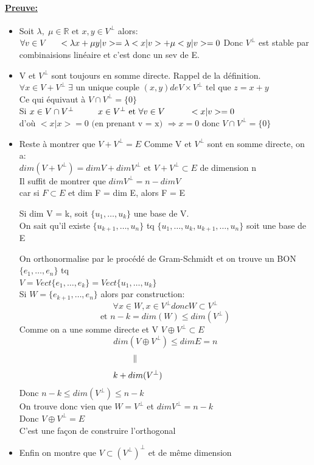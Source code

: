\documentclass{article}
\newcommand\tab[1][1cm]{\hspace*{#1}}
\begin{document}
\paragraph{\underline{Preuve:}}
\begin{itemize}
    \item Soit $\lambda,\; \mu \in \mathbb{R} \mbox{ et } x, y \in V^\perp$ alors:\\
$\forall v \in V \tab[0.5cm] <\lambda x + \mu y | v> = \lambda <x | v> + \mu <y | v> = 0$
Donc $V^\perp$ est stable par combinaisions linéaire et c'est donc un sev de E.
    \item V et $V^\perp$ sont toujours en somme directe.
Rappel de la définition. \\
$\forall x \in V + V^\perp \; \exists \mbox{ un unique couple } (x, y) de V \times V^\perp \mbox{ tel que } z = x + y$\\
Ce qui équivaut à $V \cap V^\perp = \{0\}$\\
Si $x \in V \cap V^\perp \tab x \in V^\perp \mbox{ et } \forall v \in V \tab <x|v> = 0$\\
d'où $<x|x> = 0 \mbox{ (en prenant v = x) } \Rightarrow x = 0 \mbox{ donc } V \cap V^\perp = \{0\}$
    \item Reste à montrer que $V + V^\perp = E$ Comme V et $V^\perp$ sont en somme directe, on a: \\
$dim(V + V^\perp) = dim V + dim V^\perp \mbox{ et } V + V^\perp \subset E$ de dimension n\\
Il suffit de montrer que $dim V^\perp = n - dim V$\\
car si $F \subset E$ et dim F = dim E, alors F = E

Si dim V = k, soit $\{u_1, \dots, u_k\}$ une base de V.\\
On sait qu'il existe $\{u_{k+1}, \dots, u_n\}$ tq $\{u_1, \dots, u_k, u_{k+1}, \dots, u_n\}$ soit une base de E

On orthonormalise par le procédé de Gram-Schmidt et on trouve un BON $\{e_1, \dots, e_n\}$ tq\\
$V = Vect\{e_1, \dots, e_k\} = Vect\{u_1, \dots, u_k\}$\\
Si $W = \{e_{k+1}, \dots, e_n\}$ alors par construction:
$$\forall x \in W, x \in V^\perp donc W \subset V^\perp$$
$$\mbox{et } n - k = dim(W) \leq dim(V^\perp)$$
Comme on a une somme directe et V $V \oplus V^\perp \subset E$
$$dim(V \oplus V^\perp) \leq dim E = n$$
$$\parallel \tab[2.5cm]$$
$$k + dim(V^\perp) \tab[2.3cm]$$
Donc $n - k \leq dim(V^\perp) \leq n - k$\\
On trouve donc vien que $W = V^\perp$ et $dim V^\perp = n - k$\\
Donc $V \oplus V^\perp = E$\\
C'est une façon de construire l'orthogonal
    \item Enfin on montre que $V \subset (V^\perp)^\perp$ et de même dimension
\end{itemize}
\end{document}
